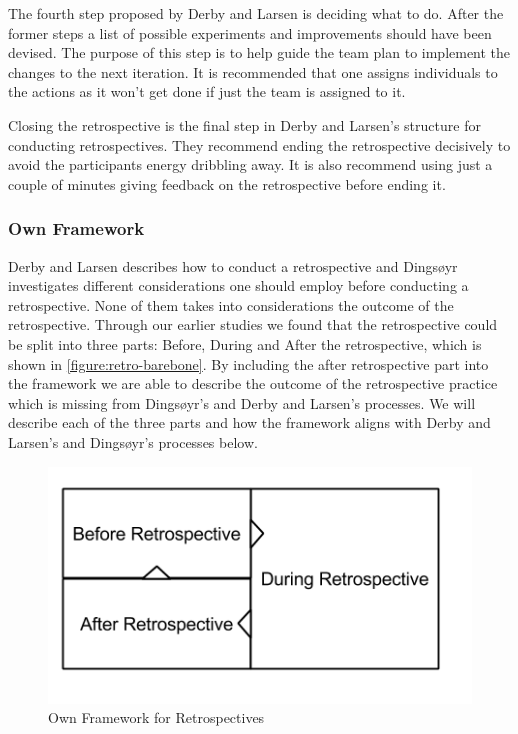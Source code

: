 The fourth step proposed by Derby and Larsen is deciding what to do. After the former steps a list of possible experiments and improvements should have been devised. The purpose of this step is to help guide the team plan to implement the changes to the next iteration. It is recommended that one assigns individuals to the actions as it won't get done if just the team is assigned to it. 

Closing the retrospective is the final step in Derby and Larsen's structure for conducting retrospectives. They recommend ending the retrospective decisively to avoid the participants energy dribbling away. It is also recommend using just a couple of minutes giving feedback on the retrospective before ending it. 

\subsubsection{Own Framework}
Derby and Larsen describes how to conduct a retrospective and Dingsøyr investigates different considerations one should employ before conducting a retrospective. None of them takes into considerations the outcome of the retrospective. Through our earlier studies \cite{Dolvik2014} we found that the retrospective could be split into three parts: Before, During and After the retrospective, which is shown in \autoref{figure:retro-barebone}. By including the after retrospective part into the framework we are able to describe the outcome of the retrospective practice which is missing from Dingsøyr's and Derby and Larsen's processes. We will describe each of the three parts and how the framework aligns with Derby and Larsen's and Dingsøyr's processes below. 

\begin{figure}[!h]
	\centering
	\includegraphics[width=\textwidth, keepaspectratio]{figures/retro-barebone.png}
	\caption{Own Framework for Retrospectives}
	\label{figure:retro-barebone}
\end{figure}

